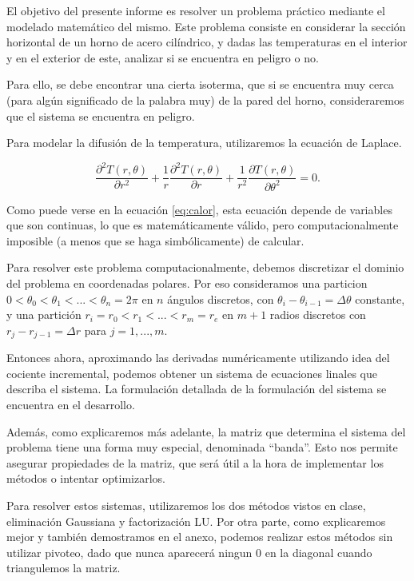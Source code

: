 
El objetivo del presente informe es resolver un problema práctico mediante el modelado matemático del mismo. Este problema consiste en considerar la sección horizontal de un horno de acero cilíndrico, y dadas las temperaturas en el interior y en el exterior de este, analizar si se encuentra en peligro o no.

Para ello, se debe encontrar una cierta isoterma, que si se encuentra muy cerca (para algún significado de la palabra muy) de la pared del horno, consideraremos que el sistema se encuentra en peligro.

Para modelar la difusión de la temperatura, utilizaremos la ecuación de Laplace.

\begin{equation}\label{eq:calor}
\frac{\partial^2T(r,\theta)}{\partial r^{2}}+\frac1r \frac{\partial^2 T(r,\theta)}{\partial r} + \frac{1}{r^2} \frac{\partial T(r, \theta)}{\partial \theta^2} = 0.
\end{equation}

Como puede verse en la ecuación \ref{eq:calor}, esta ecuación depende de variables que son continuas, lo que es matemáticamente válido, pero computacionalmente imposible (a menos que se haga simbólicamente) de calcular.

Para resolver este problema computacionalmente, debemos discretizar el dominio del problema en coordenadas polares. Por eso consideramos una particion $0 < \theta_0 < \theta_1 < ... < \theta_n = 2\pi$ en $n$ ángulos discretos, con $\theta_i - \theta_{i-1} = \Delta\theta$ constante, y una partición $r_i = r_0 < r_1 < ... < r_m = r_e$ en $m+1$ radios discretos con $r_j - r_{j-1} = \Delta r$ para $j = 1,...,m$.

Entonces ahora, aproximando las derivadas numéricamente utilizando idea del cociente incremental, podemos obtener un sistema de ecuaciones linales que describa el sistema. La formulación detallada de la formulación del sistema se encuentra en el desarrollo.

Además, como explicaremos más adelante, la matriz que determina el sistema del problema tiene una forma muy especial, denominada ``banda''. Esto nos permite asegurar propiedades de la matriz, que será útil a la hora de implementar los métodos o intentar optimizarlos.

Para resolver estos sistemas, utilizaremos los dos métodos vistos en clase, eliminación Gaussiana y factorización LU. Por otra parte, como explicaremos mejor y también demostramos en el anexo, podemos realizar estos métodos sin utilizar pivoteo, dado que nunca aparecerá ningun $0$ en la diagonal cuando triangulemos la matriz.


